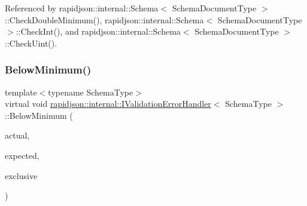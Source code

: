 Referenced by rapidjson\+::internal\+::\+Schema$<$ Schema\+Document\+Type $>$\+::\+Check\+Double\+Minimum(), rapidjson\+::internal\+::\+Schema$<$ Schema\+Document\+Type $>$\+::\+Check\+Int(), and rapidjson\+::internal\+::\+Schema$<$ Schema\+Document\+Type $>$\+::\+Check\+Uint().

\mbox{\label{classrapidjson_1_1internal_1_1_i_validation_error_handler_a903f5f9cff1fdd68139903ff394a1205}} 
\subsubsection{\texorpdfstring{BelowMinimum()}{BelowMinimum()}\hspace{0.1cm}{\footnotesize\ttfamily [2/3]}}
{\footnotesize\ttfamily template$<$typename Schema\+Type$>$ \\
virtual void \mbox{\hyperlink{classrapidjson_1_1internal_1_1_i_validation_error_handler}{rapidjson\+::internal\+::\+I\+Validation\+Error\+Handler}}$<$ Schema\+Type $>$\+::Below\+Minimum (\begin{DoxyParamCaption}\item[{\mbox{\hyperlink{stdint_8h_aec6fcb673ff035718c238c8c9d544c47}{uint64\+\_\+t}}}]{actual,  }\item[{const \mbox{\hyperlink{classrapidjson_1_1internal_1_1_i_validation_error_handler_a8a2aaf7eb28a3ce7ed81689141f3af1f}{S\+Value}} \&}]{expected,  }\item[{bool}]{exclusive }\end{DoxyParamCaption})\hspace{0.3cm}{\ttfamily [pure virtual]}}

\mbox{\label{classrapidjson_1_1internal_1_1_i_validation_error_handler_a135b3fb482df1b3241f679ffa53b2f57}} 
